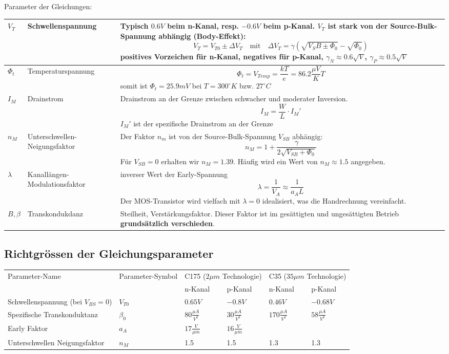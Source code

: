 Parameter der Gleichungen:

\begin{tabularx}{\linewidth}{|l|l|X|}
	\hline
		$V_T$ & Schwellenspannung &
		Typisch $0.6V$ beim n-Kanal, resp. $-0.6V$ beim p-Kanal. $V_T$ ist stark von der Source-Bulk-Spannung abhängig (Body-Effekt):
		\[ 
			V_T = V_{T0} \pm \Delta V_T \quad \text{mit} \quad \Delta V_T = \gamma(\sqrt{V_SB \pm \Phi_0} -\sqrt{\Phi_0})
		\]
		positives Vorzeichen für n-Kanal, negatives für p-Kanal, $\gamma_N \approx 0.6\sqrt{V}$, $\gamma_P \approx 0.5\sqrt{V}$ 
	\\ \hline
		$\Phi_t$ & Temperaturspannung &
		\[
			\Phi_t = V_{Temp} = \frac{kT}{e} = 86.2 \frac{\mu V}{K}T
		\]
		somit ist $\Phi_t = 25.9mV$ bei $T=300^\circ K$ bzw. $27^\circ C$
	\\ \hline
		$I_M$ & Drainstrom &
		Drainstrom an der Grenze zwischen schwacher und moderater Inversion.
		\[
			I_M = \frac{W}{L} \cdot I_M'
		\]
		$I_M'$ ist der spezifische Drainstrom an der Grenze
	\\ \hline
		$n_M$ & Unterschwellen-Neigungsfaktor &
		Der Faktor $n_m$ ist von der Source-Bulk-Spannung $V_{SB}$ abhängig:
		\[
			n_M = 1 + \frac{\gamma}{2 \sqrt{V_{SB} + \Phi_0}}
		\]
		Für $V_{SB} = 0$ erhalten wir $n_M=1.39$. Häufig wird ein Wert von $n_M \approx 1.5$ angegeben.
	\\ \hline
		$\lambda$ & Kanallängen-Modulationsfaktor &
		inverser Wert der Early-Spannung
		\[
			\lambda = \frac{1}{V_A} \approx \frac{1}{a_A L}
		\]
		Der MOS-Transistor wird vielfach mit $\lambda = 0$ idealisiert, was die Handrechnung vereinfacht.
	\\ \hline
		$B, \beta$ & Transkondukdanz &
		Steilheit, Verstärkungsfaktor. Dieser Faktor ist im gesättigten und ungesättigten Betrieb \textbf{grundsätzlich verschieden}.
	\\ \hline
\end{tabularx}


\subsection{Richtgrössen der Gleichungsparameter}
\begin{tabular}{|l|l|l|l|l|l|}
	\hline
	\multirow{2}{*}{Parameter-Name}			& \multirow{2}{*}{Parameter-Symbol}	& \multicolumn{2}{c|}{C175 ($2\mu m$ Technologie)}	& \multicolumn{2}{c|}{C35 ($35\mu m$ Technologie)}
	\\ \cline{3-6}
											&					& n-Kanal				& p-Kanal									& n-Kanal					& p-Kanal
	\\ \hline 			
	Schwellenspannung (bei $V_{BS} = 0$)	& $V_{T0}$			& $0.65V$				& $-0.8V$									& $0.46V$					& $-0.68V$
	\\ \hline
	Spezifische Transkonduktanz				& $\beta_0$			& $80\frac{\mu A}{V^2}$	& $30 \frac{\mu A}{V^2}$					& $170 \frac{\mu A}{V^2}$	& $58 \frac{\mu A}{V^2}$
	\\ \hline
	Early Faktor							& $a_A$				& $17 \frac{V}{\mu m}$	& $16 \frac{V}{\mu m}$						&							&
	\\ \hline
	Unterschwellen Neigungsfaktor			& $n_M$				& 1.5					& 1.5										& 1.3						& 1.3
	\\ \hline		
\end{tabular}


